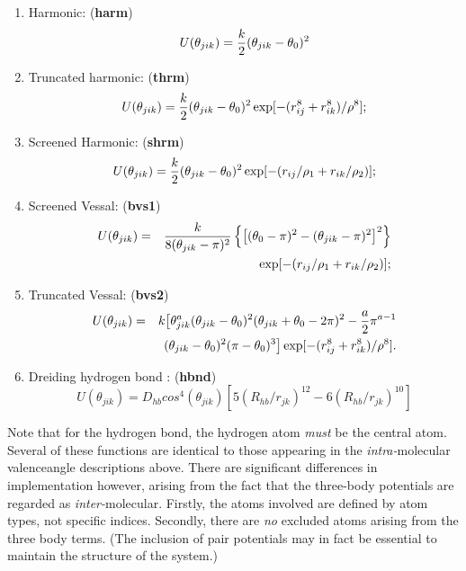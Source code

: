 \begin{enumerate}
\item Harmonic: ({\bf harm})
\begin{equation}
U(\theta_{jik})= {k\over 2} (\theta_{jik} - \theta_0)^2
\end{equation}
\item Truncated harmonic: ({\bf thrm})
\begin{equation}
U(\theta_{jik})= {k\over 2} (\theta_{jik} - \theta_0)^2
\exp[-(r_{ij}^8 + r_{ik}^8)/\rho^8];
\end{equation}
\item Screened Harmonic: ({\bf shrm})
\begin{equation}
 U(\theta_{jik})= {k\over 2} (\theta_{jik} - \theta_0)^2
\exp[-(r_{ij}/\rho_1 + r_{ik}/\rho_2)] ;
\end{equation}
\item Screened Vessal\cite{vessal-94a}: ({\bf bvs1})
\begin{eqnarray}
U(\theta_{jik})&=& {k \over 8(\theta_{jik}-\pi)^2}\left\{ \left[
(\theta_0 -\pi)^2 -(\theta_{jik}-\pi)^2\right]^2
\right\} \nonumber \\
& & \exp[-(r_{ij}/\rho_1 + r_{ik}/\rho_2)];
\end{eqnarray}
\item Truncated Vessal\cite{smith-95a}: ({\bf bvs2})
\begin{eqnarray}
 U(\theta_{jik})&=& k\big[ \theta_{jik}^a (\theta_{jik}-\theta_0)^2
(\theta_{jik}+\theta_0-2\pi)^2  - {a\over 2} \pi^{a-1}\nonumber \\
& & (\theta_{jik}-\theta_0)^2(\pi - \theta_0)^3\big]
\exp[-(r_{ij}^8 + r_{ik}^8)/\rho^8].
\end{eqnarray}
\item Dreiding hydrogen bond \cite{mayo-90a}:
({\bf hbnd})
 \begin{equation}
U(\theta_{jik})=D_{hb}cos^{4}(\theta_{jik})[5(R_{hb}/r_{jk})^{12}-6(R_{hb}/r_{jk})^{10}]
\end{equation}
\end{enumerate}
Note that for the hydrogen bond, the hydrogen atom {\em must} be the
central atom.  Several of these functions are identical to those
appearing in the {\em intra-}molecular valenceangle descriptions
above. There are significant differences in implementation however,
arising from the fact that the three-body potentials are regarded as
{\em inter-}molecular.  Firstly, the atoms involved are defined by
atom types, not specific indices.  Secondly, there are {\em no}
excluded atoms arising from the three body terms. (The inclusion of
pair potentials may in fact be essential to maintain the structure of
the system.)

